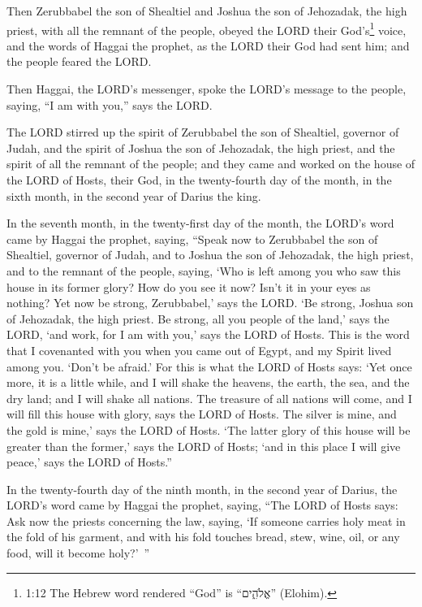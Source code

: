 \myverse{}Then Zerubbabel the son of Shealtiel and Joshua the son of Jehozadak,
the high priest, with all the remnant of the people, obeyed the LORD their God’s\footnote{1:12 The Hebrew word rendered “God” is “אֱלֹהִ֑ים” (Elohim).} voice, and the words of Haggai the prophet, as the LORD their God had sent him; and the people feared the LORD.

\myverse{}Then Haggai, the LORD’s messenger, spoke the LORD’s message to
the people, saying, “I am with you,” says the LORD.


\myverse{}The LORD stirred up the spirit of Zerubbabel the son of Shealtiel, governor of Judah, and the spirit of Joshua the son of Jehozadak, the high priest, and the spirit of all the remnant of the people; and they came and worked on the house of the LORD of Hosts, their God, \myverse{}in the twenty-fourth day of the month, in the sixth month, in the second year of Darius the king.


\mychapter{} \myverse*{}In the seventh month, in the twenty-first day of the month, the LORD’s word came by Haggai the prophet, saying, \myverse{}“Speak now to Zerubbabel the son of Shealtiel, governor of Judah, and to Joshua the son of Jehozadak, the high priest, and to the remnant of the people, saying, \myverse{}‘Who is left among you who saw this house in its former glory? How do you see it now? Isn’t it in your eyes as nothing? \myverse{}Yet now be strong, Zerubbabel,’ says the LORD. ‘Be strong, Joshua son of Jehozadak, the high priest. Be strong, all you people of the land,’ says the LORD, ‘and work, for I am with you,’ says the LORD of Hosts. \myverse{}This is the word that I covenanted with you when you came out of Egypt, and my Spirit lived among you. ‘Don’t be afraid.’ \myverse{}For this is what the LORD of Hosts says: ‘Yet once more, it is a little while, and I will shake the heavens, the earth, the sea, and the dry land; \myverse{}and I will shake all nations. The treasure of all nations will come, and I will fill this house with glory, says the LORD of Hosts. \myverse{}The silver is mine, and the gold is mine,’ says the LORD of Hosts. \myverse{}‘The latter glory of this house will be greater than the former,’ says the LORD of Hosts; ‘and in this place I will give peace,’ says the LORD of Hosts.”

 \myverse{}In the twenty-fourth day of the ninth month, in the second year of Darius, the LORD’s word came by Haggai the prophet, saying, \myverse{}“The LORD of Hosts says: Ask now the priests concerning the law, saying, \myverse{}‘If someone carries holy meat in the fold of his garment, and with his fold
touches bread, stew, wine, oil, or any food, will it become holy?’ ”

